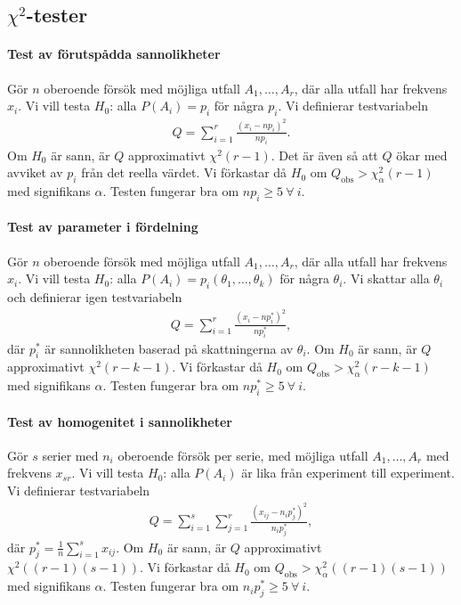\subsection{$\chi^2$-tester}

\paragraph{Test av förutspådda sannolikheter}
Gör $n$ oberoende försök med möjliga utfall $A_1, \dots, A_r$, där alla utfall har frekvens $x_i$. Vi vill testa $H_0$: alla $P(A_i) = p_i$ för några $p_i$. Vi definierar testvariabeln
\begin{align*}
	Q = \sum\limits_{i = 1}^{r}\frac{(x_i - np_i)^2}{np_i}.
\end{align*}
Om $H_0$ är sann, är $Q$ approximativt $\chi^2(r -1)$. Det är även så att $Q$ ökar med avviket av $p_i$ från det reella värdet. Vi förkastar då $H_0$ om $Q_{\text{obs}} > \chi_{\alpha}^2(r - 1)$ med signifikans $\alpha$. Testen fungerar bra om $np_{i}\geq 5\ \forall\ i$.

\paragraph{Test av parameter i fördelning}
Gör $n$ oberoende försök med möjliga utfall $A_1, \dots, A_r$, där alla utfall har frekvens $x_i$. Vi vill testa $H_0$: alla $P(A_i) = p_i(\theta_1, \dots, \theta_k)$ för några $\theta_i$. Vi skattar alla $\theta_i$ och definierar igen testvariabeln
\begin{align*}
	Q = \sum\limits_{i = 1}^{r}\frac{(x_i - np_i^*)^2}{np_i^*},
\end{align*}
där $p_i^*$ är sannolikheten baserad på skattningerna av $\theta_i$. Om $H_0$ är sann, är $Q$ approximativt $\chi^2(r - k - 1)$. Vi förkastar då $H_0$ om $Q_{\text{obs}} > \chi_{\alpha}^2(r - k - 1)$ med signifikans $\alpha$. Testen fungerar bra om $np_{i}^*\geq 5\ \forall\ i$.

\paragraph{Test av homogenitet i sannolikheter}
Gör $s$ serier med $n_i$ oberoende försök per serie, med möjliga utfall $A_1, \dots, A_r$ med frekvens $x_{sr}$. Vi vill testa $H_0$: alla $P(A_i)$ är lika från experiment till experiment. Vi definierar testvariabeln
\begin{align*}
	Q = \sum\limits_{i = 1}^{s}\sum\limits_{j = 1}^{r}\frac{(x_{ij} - n_ip_j^*)^2}{n_ip_j^*},
\end{align*}
där $p_j^* = \frac{1}{n}\sum\limits_{i = 1}^{s}x_{ij}$. Om $H_0$ är sann, är $Q$ approximativt $\chi^2((r - 1)(s - 1))$. Vi förkastar då $H_0$ om $Q_{\text{obs}} > \chi_{\alpha}^2((r - 1)(s - 1))$ med signifikans $\alpha$. Testen fungerar bra om $n_ip_j^*\geq 5\ \forall\ i$.

